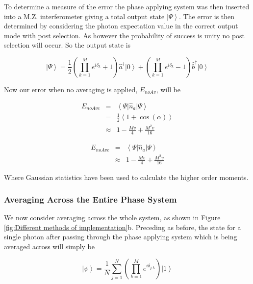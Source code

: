\documentclass[aps,pra,twocolumn,superscriptaddress,numerical]{revtex4-1}
\begin{document}
		To determine a measure of the error the phase applying system was then inserted into a M.Z. interferometer giving a total output state $\left|\Psi\right\rangle $. The error is then determined by considering the photon expectation value in the correct output mode with post selection. As however the probability of success is unity no post selection will occur. So the output state is
		
		\begin{equation}
		\left|\Psi\right\rangle 	=\frac{1}{2}\left(\prod_{k=1}^{M}e^{i\delta_{k}}+1\right)\hat{a}^{\dagger}\left|0\right\rangle +\left(\prod_{k=1}^{M}e^{i\delta_{k}}-1\right)\hat{b}^{\dagger}\left|0\right\rangle \label{eq:noAveIntState}
		\end{equation}
		
		
		Now our error when no averaging is applied, $E_{noAv}$, will be
		
		\begin{eqnarray}
		E_{noAve} & = & \left\langle \Psi\right|\hat{n}_{a}\left|\Psi\right\rangle \nonumber \\
		& = & \frac{1}{2}\left\langle 1+\cos\left(\alpha\right)\right\rangle \nonumber \\
		& \approx & 1-\frac{Mv}{4}+\frac{M^{2}v}{16}\label{eq:ErrorNoAv1}
		\end{eqnarray}
		
		
		\begin{eqnarray}
		E_{noAve} & = & \left\langle \Psi\right|\hat{n}_{a}\left|\Psi\right\rangle \nonumber \\
		& \approx & 1-\frac{Mv}{4}+\frac{M^{2}v}{16}\label{eq:ErrorNoAv}
		\end{eqnarray}
		
		Where Gaussian statistics have been used to calculate the higher order moments.
		
		
		\subsubsection{Averaging Across the Entire Phase System\label{Averaging Across the Entire Phase System}}
		
		We now consider averaging across the whole system, as shown in Figure  \ref{fig:Different methods of implementation}b. Preceding as before, the state for a single photon after passing through the phase applying system which is being averaged across will simply be
		
		\begin{equation}
		\left|\psi\right\rangle =\frac{1}{N}\sum_{j=1}^{N}\left(\prod_{k=1}^{M}e^{i\delta_{j,k}}\right)\left|1\right\rangle \label{eq:AvEndPhaseState}
		\end{equation}
		
\end{document}
